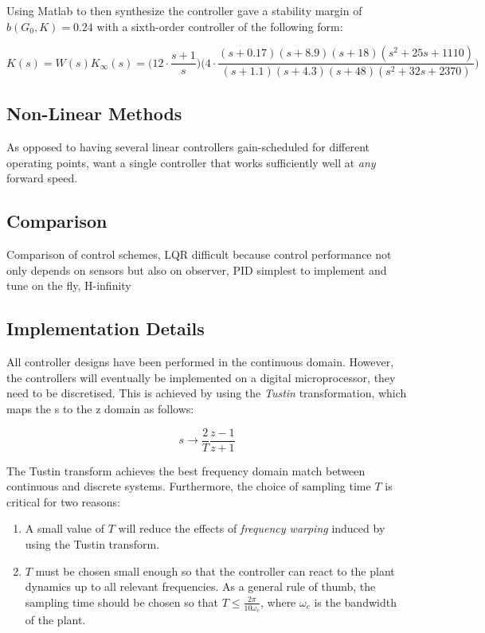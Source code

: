 Using Matlab to then synthesize the controller gave a stability margin of $b(G_0,K) = 0.24$ with a sixth-order controller of the following form:

\begin{equation*}
K(s) = W(s) K_{\infty}(s) = \Big( 12 \cdot \frac{s+1}{s} \Big) \Big(4 \cdot \frac{(s+0.17)(s+8.9)(s+18)(s^2+25s+1110)}{(s+1.1)(s+4.3)(s+48)(s^2+32s+2370)} \Big)
\end{equation*}

\subsection{Non-Linear Methods}
As opposed to having several linear controllers gain-scheduled for different operating points, want a single controller that works sufficiently well at \textit{any} forward speed.

\subsection{Comparison}
Comparison of control schemes, LQR difficult because control performance not only depends on sensors but also on observer, PID simplest to implement and tune on the fly, H-infinity

\subsection{Implementation Details}
All controller designs have been performed in the continuous domain. However, the controllers will eventually be implemented on a digital microprocessor, they need to be discretised. This is achieved by using the \textit{Tustin} transformation, which maps the s to the z domain as follows:

\begin{equation*}
s \rightarrow \frac{2}{T} \frac{z - 1}{z + 1}
\end{equation*}

The Tustin transform achieves the best frequency domain match between continuous and discrete systems. Furthermore, the choice of sampling time $T$ is critical for two reasons:

\begin{enumerate}
\item{A small value of $T$ will reduce the effects of \textit{frequency warping} induced by using the Tustin transform.}
\item{$T$ must be chosen small enough so that the controller can react to the plant dynamics up to all relevant frequencies. As a general rule of thumb, the sampling time should be chosen so that $T \leq \frac{2 \pi}{10 \omega_c}$, where $\omega_c$ is the bandwidth of the plant.}
\end{enumerate}

